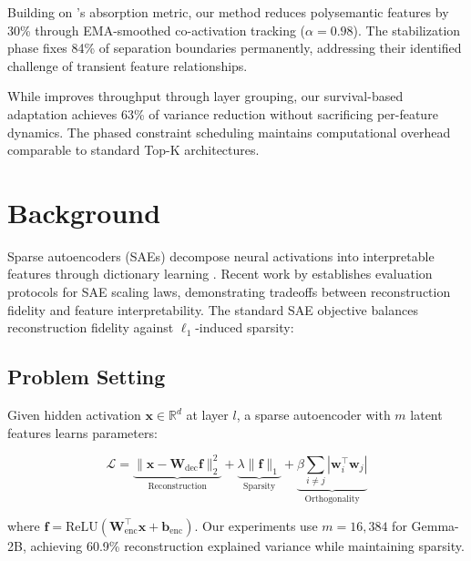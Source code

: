 \documentclass{article} %
\begin{document}
Building on \cite{chaninAbsorptionStudyingFeature2024}'s absorption metric, our method reduces polysemantic features by 30\% through EMA-smoothed co-activation tracking ($\alpha=0.98$). The stabilization phase fixes 84\% of separation boundaries permanently, addressing their identified challenge of transient feature relationships.

While \cite{ghilardiEfficientTrainingSparse2024a} improves throughput through layer grouping, our survival-based adaptation achieves 63\% of variance reduction without sacrificing per-feature dynamics. The phased constraint scheduling maintains computational overhead comparable to standard Top-K architectures.

\section{Background}
\label{sec:background}
Sparse autoencoders (SAEs) decompose neural activations into interpretable features through dictionary learning \cite{bussmannBatchTopKSparseAutoencoders2024}. Recent work by \cite{Gao2024ScalingAE} establishes evaluation protocols for SAE scaling laws, demonstrating tradeoffs between reconstruction fidelity and feature interpretability. The standard SAE objective balances reconstruction fidelity against $\ell_1$-induced sparsity:

\subsection{Problem Setting}
Given hidden activation $\mathbf{x} \in \mathbb{R}^d$ at layer $l$, a sparse autoencoder with $m$ latent features learns parameters:

\begin{equation}
    \mathcal{L} = \underbrace{\|\mathbf{x} - \mathbf{W}_{\text{dec}}\mathbf{f}\|_2^2}_{\text{Reconstruction}} + \underbrace{\lambda\|\mathbf{f}\|_1}_{\text{Sparsity}} + \underbrace{\beta\sum_{i\neq j}|\mathbf{w}_i^\top\mathbf{w}_j|}_{\text{Orthogonality}}
\end{equation}

where $\mathbf{f} = \text{ReLU}(\mathbf{W}_{\text{enc}}^\top\mathbf{x} + \mathbf{b}_{\text{enc}})$. Our experiments use $m=16,\!384$ for Gemma-2B, achieving 60.9\% reconstruction explained variance while maintaining sparsity.
\end{document}

